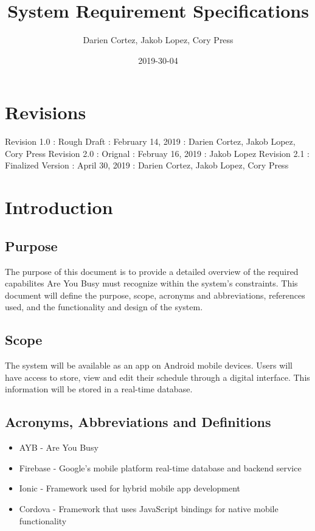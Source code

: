 \documentclass{article}
\title{System Requirement Specifications}
\date{2019-30-04}
\author{Darien Cortez, Jakob Lopez, Cory Press}
\begin{document}
  \maketitle
  \newpage

  \tableofcontents

  \section{Revisions}
  Revision 1.0 : Rough Draft : February 14, 2019 : Darien Cortez, Jakob Lopez, Cory Press\newline 
  Revision 2.0 : Orignal : Februay 16, 2019 : Jakob Lopez\newline 
  Revision 2.1 : Finalized Version : April 30, 2019 : Darien Cortez, Jakob Lopez, Cory Press
  
  \section{Introduction}
  \subsection{Purpose} 
  The purpose of this document is to provide a detailed overview of the required capabilites 
  Are You Busy must recognize within the system's constraints. This document will define the 
  purpose, scope, acronyms and abbreviations, references used, and the functionality and design 
  of the system.   
  \subsection{Scope}  
  The system will be available as an app on Android mobile devices. Users will have access to 
  store, view and edit their schedule through a digital interface. This information will be stored in a 
  real-time database.
  \subsection{Acronyms, Abbreviations and Definitions}
  \begin{itemize}
    \item AYB - Are You Busy
    \item Firebase - Google's mobile platform real-time database and backend service
    \item Ionic - Framework used for hybrid mobile app development
    \item Cordova - Framework that uses JavaScript bindings for native mobile functionality
  \end{itemize}
\end{document}
